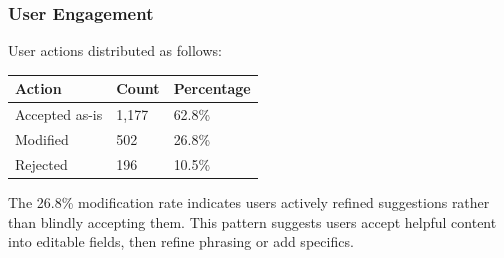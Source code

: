 \subsubsection{User Engagement}

User actions distributed as follows:

\begin{table}[htbp]
\centering
\begin{tabular}{lll}
\toprule
Action & Count & Percentage \\
\midrule
Accepted as-is & 1,177 & 62.8\% \\
Modified & 502 & 26.8\% \\
Rejected & 196 & 10.5\% \\
\bottomrule
\end{tabular}
\end{table}

The 26.8\% modification rate indicates users actively refined suggestions rather than blindly accepting them. This pattern suggests users accept helpful content into editable fields, then refine phrasing or add specifics.
